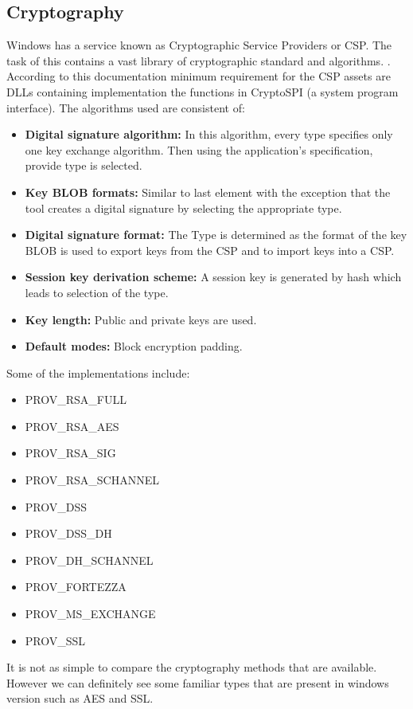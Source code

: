 \documentclass[journal,10pt,onecolumn,compsoc,letterpaper,draftclsnofoot,table,xcdraw]{IEEEtran} \usepackage[margin=0.75in]{geometry}
\begin{document}
\subsection{Cryptography}
\noindent Windows has a service known as Cryptographic Service Providers or CSP. The task of this contains a vast library of cryptographic standard and algorithms. \cite{10}. According to this documentation minimum requirement for the CSP assets are DLLs containing implementation the functions in CryptoSPI (a system program interface). The algorithms used are consistent of:
\begin{itemize}
\item \textbf{Digital signature algorithm:} In this algorithm, every type specifies only one key exchange algorithm. Then using the application's specification, provide type is selected.
\item \textbf{Key BLOB formats:} Similar to last element with the exception that  the tool creates a digital signature by selecting the appropriate type.
\item \textbf{Digital signature format:} The Type is determined as the format of the key BLOB is used to export keys from the CSP and to import keys into a CSP.
\item \textbf{Session key derivation scheme:} A session key is generated by hash which leads to selection of the type.
\item \textbf{Key length:} Public and private keys are used.
\item \textbf{Default modes:} Block  encryption padding.
\end{itemize}
\noindent Some of the implementations include:
\begin{itemize}
\item PROV\_RSA\_FULL
\item PROV\_RSA\_AES
\item PROV\_RSA\_SIG
\item PROV\_RSA\_SCHANNEL
\item PROV\_DSS
\item PROV\_DSS\_DH
\item PROV\_DH\_SCHANNEL
\item PROV\_FORTEZZA
\item PROV\_MS\_EXCHANGE
\item PROV\_SSL
\end{itemize}
\noindent It is not as simple to compare the cryptography methods that are available. However we can definitely see some familiar types that are present in windows version such as AES and SSL.
\end{document}
